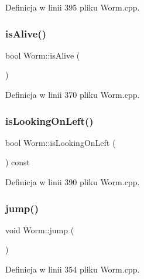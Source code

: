 Definicja w linii 395 pliku Worm.\+cpp.

\mbox{\label{class_worm_a606868b7856598eef50b8ebcd2374927}} 
\subsubsection{\texorpdfstring{is\+Alive()}{isAlive()}}
{\footnotesize\ttfamily bool Worm\+::is\+Alive (\begin{DoxyParamCaption}{ }\end{DoxyParamCaption})}



Definicja w linii 370 pliku Worm.\+cpp.

\mbox{\label{class_worm_a3a90a91ddbe99e67f48e54a57d12b5c7}} 
\subsubsection{\texorpdfstring{is\+Looking\+On\+Left()}{isLookingOnLeft()}}
{\footnotesize\ttfamily bool Worm\+::is\+Looking\+On\+Left (\begin{DoxyParamCaption}{ }\end{DoxyParamCaption}) const}



Definicja w linii 390 pliku Worm.\+cpp.

\mbox{\label{class_worm_ae4cd763e0edd18cecab42b39142cea14}} 
\subsubsection{\texorpdfstring{jump()}{jump()}}
{\footnotesize\ttfamily void Worm\+::jump (\begin{DoxyParamCaption}{ }\end{DoxyParamCaption})}



Definicja w linii 354 pliku Worm.\+cpp.

\mbox{\label{class_worm_ab517b492de0e583254c288cc583cbeb1}} 
